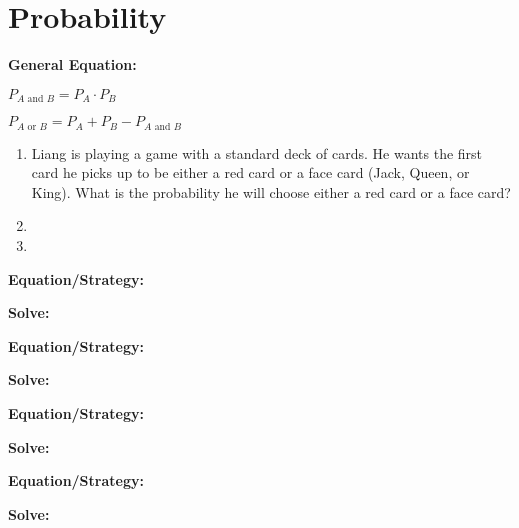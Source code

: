 \section{Probability}

\textbf{General Equation:}

\begin{center}
\renewcommand{\columnseprule}{0pt}
\begin{multicols}{2}
$P_{A\mbox{ and }B}=P_A\cdot P_B$

$P_{A\mbox{ or }B}=P_A+P_B-P_{A\mbox{ and }B}$
\end{multicols}
\end{center}

\begin{enumerate}[labelindent=*,style=multiline,leftmargin=*,label=\textbf{Example \arabic*:}]
\item Liang is playing a game with a standard deck of cards. He wants the first card he picks up to be either a red card or a face card (Jack, Queen, or King). What is the probability he will choose either a red card or a face card?
\vfill\item
\vfill\item
\end{enumerate}

\vfill
\newpage
\begin{multicols*}{2}
\begin{outline}[enumerate]
\medium

\1 

\bigskip
\textbf{Equation/Strategy:} \hrulefill

\bigskip
\textbf{Solve:}

\vfill
\2 
\2 
\2 
\2 
\2 

\midline

\1 

\bigskip
\textbf{Equation/Strategy:} \hrulefill

\bigskip
\textbf{Solve:}

\vfill
\2 
\2 
\2 
\2 
\2 

\columnbreak
\advanced

\1 

\bigskip
\textbf{Equation/Strategy:} \hrulefill

\bigskip
\textbf{Solve:}

\vfill
\2 
\2 
\2 
\2 
\2 

\midline

\1 

\bigskip
\textbf{Equation/Strategy:}

\bigskip
\textbf{Solve:}

\vfill
\2
\2
\2
\2
\2
\end{outline}
\end{multicols*}